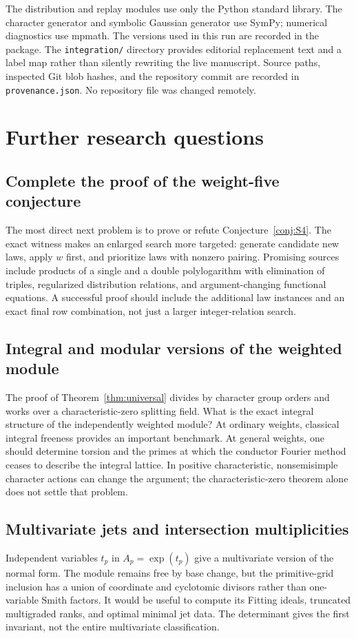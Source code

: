 \documentclass[11pt]{article}
\numberwithin{equation}{section}
\theoremstyle{definition}
\theoremstyle{remark}
\newcommand{\code}[1]{\texttt{\small #1}}
\begin{document}
The distribution and replay modules use only the Python standard library.
The character generator and symbolic Gaussian generator use SymPy;
numerical diagnostics use mpmath. The versions used in this run are
recorded in the package. The \code{integration/} directory provides
editorial replacement text and a label map rather than silently
rewriting the live manuscript. Source paths, inspected Git blob hashes,
and the repository commit are recorded in \code{provenance.json}.
No repository file was changed remotely.

\section{Further research questions}\label{sec:future}

\subsection{Complete the proof of the weight-five conjecture}
The most direct next problem is to prove or refute
Conjecture~\ref{conj:S4}. The exact witness makes an enlarged search
more targeted: generate candidate new laws, apply $w$ first, and
prioritize laws with nonzero pairing. Promising sources include
products of a single and a double polylogarithm with elimination of
triples, regularized distribution relations, and argument-changing
functional equations. A successful proof should include the additional
law instances and an exact final row combination, not just a larger
integer-relation search.

\subsection{Integral and modular versions of the weighted module}
The proof of Theorem~\ref{thm:universal} divides by character group
orders and works over a characteristic-zero splitting field. What is
the exact integral structure of the independently weighted module?
At ordinary weights, classical integral freeness provides an important
benchmark. At general weights, one should determine torsion and the
primes at which the conductor Fourier method ceases to describe the
integral lattice. In positive characteristic, nonsemisimple character
actions can change the argument; the characteristic-zero theorem
alone does not settle that problem.

\subsection{Multivariate jets and intersection multiplicities}
Independent variables $t_p$ in $A_p=\exp(t_p)$ give a multivariate
version of the normal form. The module remains free by base change,
but the primitive-grid inclusion has a union of coordinate and
cyclotomic divisors rather than one-variable Smith factors. It would
be useful to compute its Fitting ideals, truncated multigraded ranks,
and optimal minimal jet data. The determinant gives the first
invariant, not the entire multivariate classification.
\end{document}
